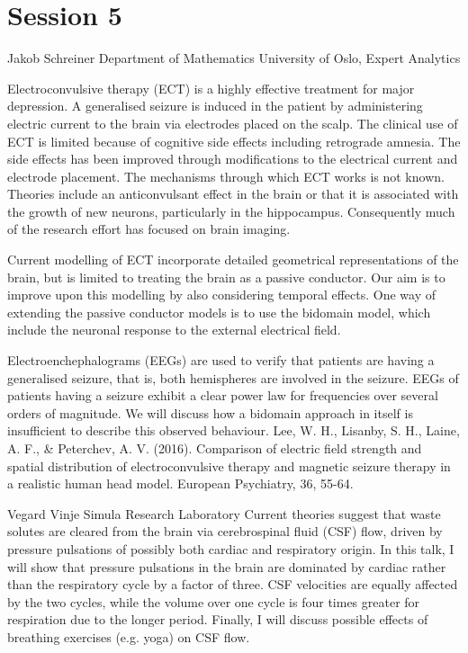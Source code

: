 \documentclass{article}
\begin{document}
\newpage
\section*{Session 5}

{Jakob Schreiner}
{Department of Mathematics University of Oslo, Expert Analytics}
{Electroconvulsive therapy (ECT) is a highly effective treatment for major depression. A
generalised seizure is induced in the patient by administering electric current to the
brain via electrodes placed on the scalp. The clinical use of ECT is limited because of
cognitive side effects including retrograde amnesia. The side effects has been improved
through modifications to the electrical current and electrode placement. The mechanisms
through which ECT works is not known. Theories include an anticonvulsant effect in the
brain or that it is associated with the growth of new neurons, particularly in the
hippocampus. Consequently much of the research effort has focused on brain imaging.

Current modelling of ECT incorporate detailed geometrical representations of the brain,
but is limited to treating the brain as a passive conductor. Our aim is to improve upon
this modelling by also considering temporal effects. One way of extending the passive
conductor models is to use the bidomain model, which include the neuronal response to the
external electrical field.

Electroenchephalograms (EEGs) are used to verify that patients are having a generalised
seizure, that is, both hemispheres are involved in the seizure. EEGs of patients having
a seizure exhibit a clear power law for frequencies over several orders of magnitude. We
will discuss how a bidomain approach in itself is insufficient to describe this observed
behaviour. \newline\newline
\small{Lee, W. H., Lisanby, S. H., Laine, A. F., & Peterchev, A. V. (2016). Comparison of
electric field strength and spatial distribution of electroconvulsive therapy and magnetic
seizure therapy in a realistic human head model. European Psychiatry, 36, 55-64.}}
{Vegard Vinje}
{Simula Research Laboratory}
{Current theories suggest that waste solutes are cleared from the brain
via cerebrospinal fluid (CSF) flow, driven by pressure pulsations of
possibly both cardiac and respiratory origin. In this talk, I will show
that pressure pulsations in the brain are dominated by cardiac rather
than the respiratory cycle by a factor of three. CSF velocities are
equally affected by the two cycles, while the volume over one cycle is
four times greater for respiration due to the longer period. Finally, I
will discuss possible effects of breathing exercises (e.g. yoga) on CSF
flow.}
\end{document}
